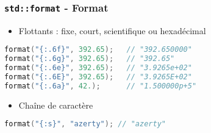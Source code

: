 \documentclass[C++.tex]{subfiles}
\begin{document}
\begin{frame}[fragile]
	\frametitle{\lstinline|std::format| - Format}
	\begin{itemize}
		\item Flottants : fixe, court, scientifique ou hexadécimal
	\end{itemize}

	\begin{lstlisting}[language=C++]
format("{:.6f}", 392.65);   // "392.650000"
format("{:.6g}", 392.65);   // "392.65"
format("{:.6e}", 392.65);   // "3.9265e+02"
format("{:.6E}", 392.65);   // "3.9265E+02"
format("{:.6a}", 42.);    	// "1.500000p+5"\end{lstlisting}


	\begin{itemize}
		\item Chaîne de caractère
	\end{itemize}

	\begin{lstlisting}[language=C++]
format("{:s}", "azerty"); // "azerty"\end{lstlisting}
\end{frame}
\end{document}
